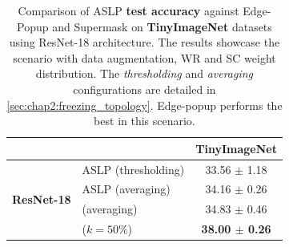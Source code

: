 \begin{table}[htbp]
  \centering
  \begin{tabular}{llc}
    \cmidrule[\heavyrulewidth]{3-3}
                                        &                                                  & \textbf{TinyImageNet}     \\
    \toprule
    \multirow{4}{*}{\textbf{ResNet-18}} & \ac{ASLP}  (thresholding)                             & 33.56 $\pm$ 1.18          \\
                                        & \ac{ASLP} (averaging)                                 & 34.16 $\pm$ 0.26          \\
                                        & \cite{DBLP:conf/nips/ZhouLLY19} (averaging)      & 34.83 $\pm$ 0.46          \\
                                        & \cite{DBLP:conf/cvpr/RamanujanWKFR20} ($k=50\%$) & \textbf{38.00 $\pm$ 0.26} \\
    \bottomrule
  \end{tabular}

  \caption{Comparison of \ac{ASLP} \textbf{test accuracy} against Edge-Popup and
    Supermask \cite{DBLP:conf/cvpr/RamanujanWKFR20,DBLP:conf/nips/ZhouLLY19} on
    \textbf{TinyImageNet} datasets using ResNet-18 architecture. The results
    showcase the scenario with data augmentation, \acf{WR} and \acf{SC} weight
    distribution. The \emph{thresholding} and \emph{averaging} configurations
    are detailed in \cref{sec:chap2:freezing_topology}. Edge-popup
    \cite{DBLP:conf/cvpr/RamanujanWKFR20} performs the best in this scenario.}
  \label{tab:chap2:tinyimagenet_performances_comparison}
\end{table}



